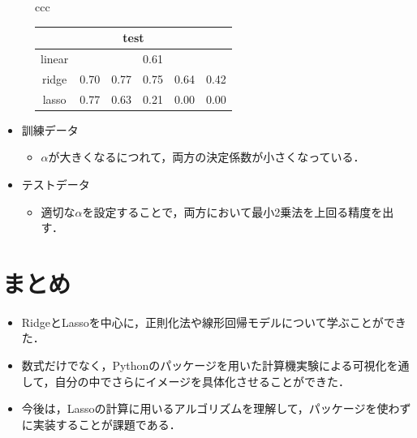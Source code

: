 \documentclass[dvipdfmx, 10pt]{beamer}
\begin{document}
\begin{frame}{\insertsubsection}
\begin{figure}[H]
\begin{tabular}{ccc}
\begin{minipage}{0.6\hsize}
\begin{table}[H]
\begin{tabular}{|c|c|c|c|c|c|}
                        		\hline
                        		\hline
                        		\multicolumn{6}{|c|}{test} \\
                        		\hline
                        		linear & \multicolumn{5}{|c|}{0.61} \\
                        		\hline
                        		ridge & 0.70 & 0.77 & 0.75 &0.64 & 0.42\\
                        		\hline
                        		lasso & 0.77 & 0.63 & 0.21 & 0.00 & 0.00 \\
                        		\hline
                                	\end{tabular}
                        	\label{tab:score}
                    \end{table}
             \end{minipage}
    	\end{tabular}
    \end{figure}
    \begin{itemize}
        \item 訓練データ
         \begin{itemize}
            \item $\alpha$が大きくなるにつれて，両方の決定係数が小さくなっている．
        \end{itemize}
       \item テストデータ
         \begin{itemize}
            \item 適切な$\alpha$を設定することで，両方において最小2乗法を上回る精度を出す．
        \end{itemize}
    \end{itemize}
\end{frame}

\section{まとめ}
\begin{frame}{\insertsection}
    
    \begin{itemize}
        \item RidgeとLassoを中心に，正則化法や線形回帰モデルについて学ぶことができた．
        \item 数式だけでなく，Pythonのパッケージを用いた計算機実験による可視化を通して，自分の中でさらにイメージを具体化させることができた．
        \item 今後は，Lassoの計算に用いるアルゴリズムを理解して，パッケージを使わずに実装することが課題である．
    \end{itemize}
\end{frame}
\end{document}
